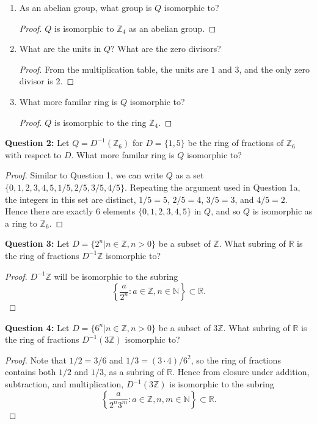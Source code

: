 \documentclass{article}
\begin{document}
\begin{enumerate}[label={\bf(\alph*)}]
    \item As an abelian group, what group is $Q$ isomorphic to?
      \begin{proof}
        $Q$ is isomorphic to $\mathbb{Z}_4$ as an abelian group.
      \end{proof}

    \item What are the units in $Q$? What are the zero divisors?
      \begin{proof}
        From the multiplication table, the units are $1$ and $3$, and the
        only zero divisor is 2. 
      \end{proof}

    \item What more familar ring is $Q$ isomorphic to?
      \begin{proof}
        $Q$ is isomorphic to the ring $\mathbb{Z}_4$.
      \end{proof}
  \end{enumerate}

\textbf{Question 2:} Let $Q=D^{-1}(\mathbb{Z}_6)$ for $D=\{1,5\}$ be the
  ring of fractions of $\mathbb{Z}_6$ with respect to $D$. What more
  familar ring is $Q$ isomorphic to?

  \begin{proof}
    Similar to Question 1, we can write $Q$ as a set
    $\{0,1,2,3,4,5,1/5,2/5,3/5,4/5\}$. Repeating the argument used in
    Question 1a, the integers in this set are distinct, $1/5=5$, $2/5=4$,
    $3/5=3$, and $4/5=2$. Hence there are exactly 6 elements
    $\{0,1,2,3,4,5\}$ in $Q$, and so $Q$ is isomorphic as a ring to
    $\mathbb{Z}_6$.
  \end{proof}

\textbf{Question 3:} Let $D=\{2^n|n\in\mathbb{Z},n>0\}$ be a subset of
  $\mathbb{Z}$. What subring of $\mathbb{R}$ is the ring of fractions
  $D^{-1}\mathbb{Z}$ isomorphic to?

  \begin{proof}
    $D^{-1}\mathbb{Z}$ will be isomorphic to the subring
    \[\left\{\frac{a}{2^n}:
    a\in\mathbb{Z},n\in\mathbb{N}\right\} \subset\mathbb{R}.\]
  \end{proof}

\textbf{Question 4:} Let $D=\{6^n|n\in\mathbb{Z},n>0\}$ be a subset of
  $3\mathbb{Z}$. What subring of $\mathbb{R}$ is the ring of fractions
  $D^{-1}(3\mathbb{Z})$ isomorphic to?

  \begin{proof}
    Note that $1/2=3/6$ and $1/3=(3\cdot4)/6^2$, so the ring of fractions
    contains both $1/2$ and $1/3$, as a subring of $\mathbb{R}$. Hence from
    closure under addition, subtraction, and multiplication,
    $D^{-1}(3\mathbb{Z})$ is isomorphic to the subring
    \[\left\{\frac{a}{2^n3^m}:
    a\in\mathbb{Z},n,m\in\mathbb{N}\right\} \subset\mathbb{R}.\]
  \end{proof}
\end{document}
